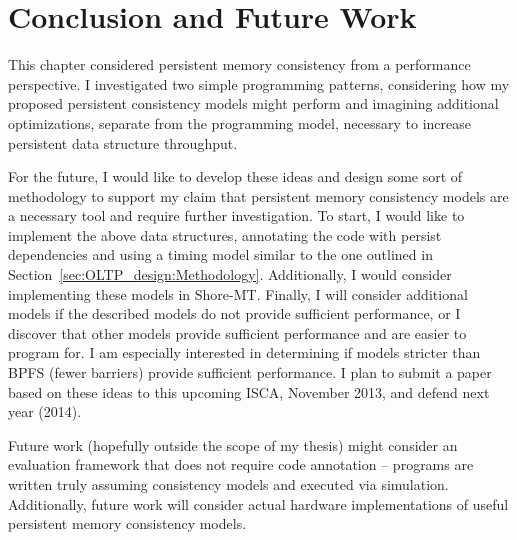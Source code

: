 \section{Conclusion and Future Work}
\label{sec:PMC_patterns:Conclusion}

This chapter considered persistent memory consistency from a performance perspective.
I investigated two simple programming patterns, considering how my proposed persistent consistency models might perform and imagining additional optimizations, separate from the programming model, necessary to increase persistent data structure throughput.

For the future, I would like to develop these ideas and design some sort of methodology to support my claim that persistent memory consistency models are a necessary tool and require further investigation.
To start, I would like to implement the above data structures, annotating the code with persist dependencies and using a timing model similar to the one outlined in Section~\ref{sec:OLTP_design:Methodology}.
Additionally, I would consider implementing these models in Shore-MT.
Finally, I will consider additional models if the described models do not provide sufficient performance, or I discover that other models provide sufficient performance and are easier to program for.
I am especially interested in determining if models stricter than BPFS (fewer barriers) provide sufficient performance.
I plan to submit a paper based on these ideas to this upcoming ISCA, November 2013, and defend next year (2014).

Future work (hopefully outside the scope of my thesis) might consider an evaluation framework that does not require code annotation -- programs are written truly assuming consistency models and executed via simulation.
Additionally, future work will consider actual hardware implementations of useful persistent memory consistency models.

